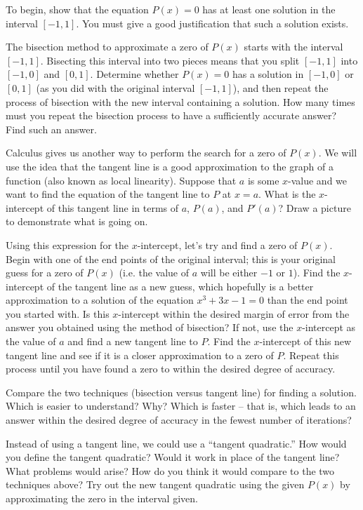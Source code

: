\documentclass
[justified,nohyper]
{tufte-handout}
\theoremstyle{mydef}
\begin{document}
To begin, show that the equation $P(x)=0$ has at least one solution in the interval $[-1,1]$. You must give a good justification that such a solution exists.

The bisection method to approximate a zero of $P(x)$ starts with the interval $[-1,1]$. Bisecting this interval into two pieces means that you split $[-1,1]$ into $[-1,0]$ and $[0,1]$. Determine whether $P(x)=0$ has a solution in $[-1,0]$ or $[0,1]$ (as you did with the original interval $[-1,1]$), and then repeat the process of bisection with the new interval containing a solution. How many times must you repeat the bisection process to have a sufficiently accurate answer? Find such an answer.

Calculus gives us another way to perform the search for a zero of $P(x)$. We will use the idea that the tangent line is a good approximation to the graph of a function (also known as local linearity). Suppose that $a$ is some $x$-value and we want to find the equation of the tangent line to $P$ at $x=a$. What is the $x$-intercept of this tangent line in terms of $a$, $P(a)$, and $P'(a)$? Draw a picture to demonstrate what is going on.

Using this expression for the $x$-intercept, let's try and find a zero of $P(x)$. Begin with one of the end points of the original interval; this is your original guess for a zero of $P(x)$ (i.e. the value of $a$ will be either $-1$ or $1$). Find the $x$-intercept of the tangent line as a new guess, which hopefully is a better approximation to a solution of the equation $x^3+3x-1=0$ than the end point you started with. Is this $x$-intercept within the desired margin of error from the answer you obtained using the method of bisection? If not, use the $x$-intercept as the value of $a$ and find a new tangent line to $P$. Find the $x$-intercept of this new tangent line and see if it is a closer approximation to a zero of $P$. Repeat this process until you have found a zero to within the desired degree of accuracy.

Compare the two techniques (bisection versus tangent line) for finding a solution. Which is easier to understand? Why? Which is faster -- that is, which leads to an answer within the desired degree of accuracy in the fewest number of iterations?

Instead of using a tangent line, we could use a ``tangent quadratic.'' How would you define the tangent quadratic? Would it work in place of the tangent line? What problems would arise? How do you think it would compare to the two techniques above? Try out the new tangent quadratic using the given $P(x)$ by approximating the zero in the interval given.
\end{document}
